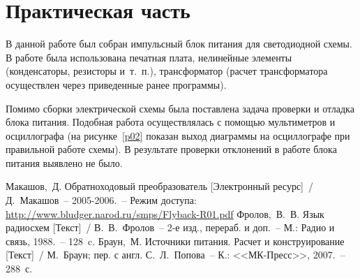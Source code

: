 \section{Практическая часть}
В данной работе был собран импульсный блок питания для светодиодной схемы. В
работе была использована печатная плата, нелинейные элементы (конденсаторы,
резисторы и~т.~п.), трансформатор (расчет трансформатора осуществлен через
приведенные ранее программы).

Помимо сборки электрической схемы была поставлена задача проверки и отладка
блока питания. Подобная работа осуществлялась с помощью мультиметров и
осциллографа (на рисунке~\ref{p02} показан выход диаграммы на осциллографе при
правильной работе схемы). В результате проверки отклонений в работе блока
питания выявлено не было.

\newpage
{}
\begin{thebibliography}{9}
	 Макашов,~Д. Обратноходовый преобразователь [Электронный ресурс]~/
	Д.~Макашов~-- 2005-2006.~-- Режим доступа:
	\href{http://www.bludger.narod.ru/smps/Flyback-R01.pdf}
	{http://www.bludger.narod.ru/smps/Flyback-R01.pdf}
	 Фролов,~В.~В. Язык радиосхем [Текст]~/ В.~В.~Фролов~-- 2-е изд., перераб.
	и доп.~-- М.: Радио и связь, 1988.~-- 128~c.
	 Браун,~М. Источники питания. Расчет и конструирование [Текст]~/
	М.~Браун; пер. с англ. С.~Л.~Попова~-- К.: <<МК-Пресс>>, 2007.~-- 288~с.
\end{thebibliography} 
